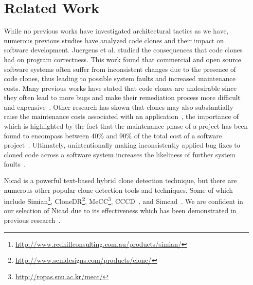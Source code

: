 \vspace{-10pt}
\section{Related Work}
\label{sec: relatedwork}
While no previous works have investigated architectural tactics as we have, numerous previous studies have analyzed code clones and their impact on software development. Juergens et al.\cite{juergens2009code} studied the consequences that code clones had on program correctness. This work found that commercial and open source software systems often suffer from inconsistent changes due to the presence of code clones, thus leading to possible system faults and increased maintenance costs. Many previous works have stated that code clones are undesirable since they often lead to more bugs and make their remediation process more difficult and expensive~\cite{Mondal:2012:ESC:2387358.2387360,Duala-Ekoko:2010:CRD:1767751.1767754}. Other research has shown that clones may also substantially raise the maintenance costs associated with an application~\cite{juergens2009code}, the importance of which is highlighted by the fact that the maintenance phase of a project has been found to encompass between 40\% and 90\% of the total cost of a software project~\cite{Shukla:2008:ESM:1342211.1342232}. Ultimately, unintentionally making inconsistently applied bug fixes to cloned code across a software system increases the likeliness of further system faults~\cite{Deissenboeck_2010}.


Nicad is a powerful text-based hybrid clone detection technique, but there are numerous other popular clone detection tools and techniques. Some of which include Simian\footnote{\url{http://www.redhillconsulting.com.au/products/simian/}}, CloneDR\footnote{\url{http://www.semdesigns.com/products/clone/}}, MeCC\footnote{\url{http://ropas.snu.ac.kr/mecc/}}, CCCD~\cite{Krutz:2015:EEU:2695664.2695929}, and Simcad~\cite{6613857}. We are confident in our selection of Nicad due to its effectiveness which has been demonstrated in previous research~\cite{Roy:2008:NAD:1437898.1438600}. 







